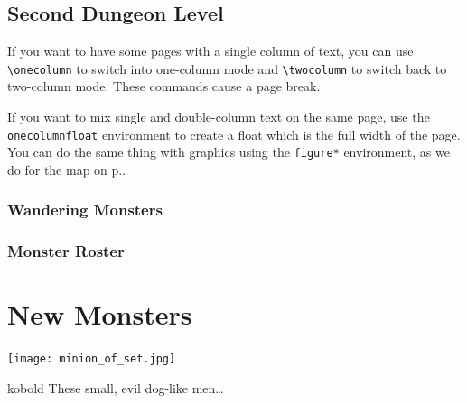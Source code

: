 \documentclass[letterpaper,serif]{module}
\begin{document}

\begin{onecolumnfloat}[t]
\part{Second Dungeon Level}

If you want to have some pages with a single column of text, you can use \verb|\onecolumn| to switch
into one-column mode and \verb|\twocolumn| to switch back to two-column mode. These commands cause
a page break.

If you want to mix single and double-column text on the same page, use the \verb|onecolumnfloat| environment
to create a float which is the full width of the page. You can do the same thing with graphics using
the \verb|figure*| environment, as we do for the map on p.\pageref{img:map}.

\section*{Wandering Monsters}
\label{wanderingmonsters}

\begin{wanderingmonsters}[b]
\end{wanderingmonsters}

\section*{Monster Roster}

\begin{monsterroster}
\end{monsterroster}
\end{onecolumnfloat}

\lipsum

%
%

\part{New Monsters}

\texttt{[image: minion\_of\_set.jpg]}

\begin{newmonster}{kobold}
These small, evil dog-like men\ldots

\lipsum
\end{newmonster}
\end{document}
